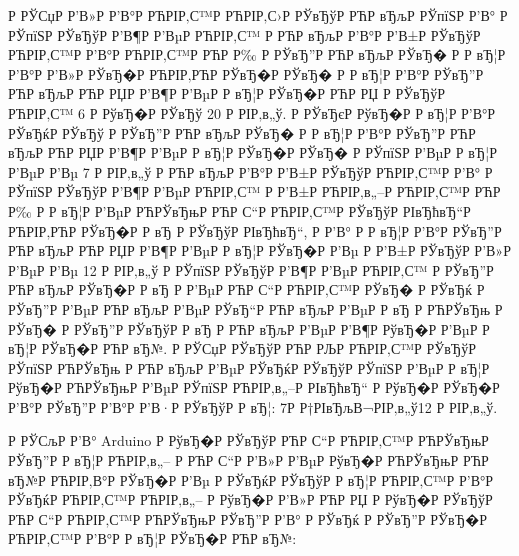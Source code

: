 \documentclass[a4paper,14pt]{extarticle}
\begin{document}
Р  РЎСџР  Р’В»Р  Р’В°Р РЋРІР‚С™Р РЋРІР‚С›Р  РЎвЂўР РЋР вЂљР  РЎпїЅР  Р’В° Р  РЎпїЅР  РЎвЂўР  Р’В¶Р  Р’ВµР РЋРІР‚С™ Р РЋР вЂљР  Р’В°Р  Р’В±Р  РЎвЂўР РЋРІР‚С™Р  Р’В°Р РЋРІР‚С™Р РЋР Р‰ Р  РЎвЂ”Р РЋР вЂљР  РЎвЂ� Р  Р вЂ¦Р  Р’В°Р  Р’В»Р  РЎвЂ�Р РЋРІР‚РЋР  РЎвЂ�Р  РЎвЂ� Р  Р вЂ¦Р  Р’В°Р  РЎвЂ”Р РЋР вЂљР РЋР РЏР  Р’В¶Р  Р’ВµР  Р вЂ¦Р  РЎвЂ�Р РЋР РЏ Р  РЎвЂўР РЋРІР‚С™ 6 Р  РўвЂ�Р  РЎвЂў 20 Р  РІР‚в„ў. Р  РЎвЂєР  РўвЂ�Р  Р вЂ¦Р  Р’В°Р  РЎвЂќР  РЎвЂў Р  РЎвЂ”Р РЋР вЂљР  РЎвЂ� Р  Р вЂ¦Р  Р’В°Р  РЎвЂ”Р РЋР вЂљР РЋР РЏР  Р’В¶Р  Р’ВµР  Р вЂ¦Р  РЎвЂ�Р  РЎвЂ� Р  РЎпїЅР  Р’ВµР  Р вЂ¦Р  Р’ВµР  Р’Вµ 7 Р  РІР‚в„ў Р РЋР вЂљР  Р’В°Р  Р’В±Р  РЎвЂўР РЋРІР‚С™Р  Р’В° Р  РЎпїЅР  РЎвЂўР  Р’В¶Р  Р’ВµР РЋРІР‚С™ Р  Р’В±Р РЋРІР‚в„–Р РЋРІР‚С™Р РЋР Р‰ Р  Р вЂ¦Р  Р’ВµР РЋРЎвЂњР РЋР С“Р РЋРІР‚С™Р  РЎвЂўР  РІвЂћвЂ“Р РЋРІР‚РЋР  РЎвЂ�Р  Р вЂ Р  РЎвЂўР  РІвЂћвЂ“, Р  Р’В° Р  Р вЂ¦Р  Р’В°Р  РЎвЂ”Р РЋР вЂљР РЋР РЏР  Р’В¶Р  Р’ВµР  Р вЂ¦Р  РЎвЂ�Р  Р’Вµ Р  Р’В±Р  РЎвЂўР  Р’В»Р  Р’ВµР  Р’Вµ 12 Р  РІР‚в„ў Р  РЎпїЅР  РЎвЂўР  Р’В¶Р  Р’ВµР РЋРІР‚С™ Р  РЎвЂ”Р РЋР вЂљР  РЎвЂ�Р  Р вЂ Р  Р’ВµР РЋР С“Р РЋРІР‚С™Р  РЎвЂ� Р  РЎвЂќ Р  РЎвЂ”Р  Р’ВµР РЋР вЂљР  Р’ВµР  РЎвЂ“Р РЋР вЂљР  Р’ВµР  Р вЂ Р РЋРЎвЂњ Р  РЎвЂ� Р  РЎвЂ”Р  РЎвЂўР  Р вЂ Р РЋР вЂљР  Р’ВµР  Р’В¶Р  РўвЂ�Р  Р’ВµР  Р вЂ¦Р  РЎвЂ�Р РЋР вЂ№. Р  РЎСџР  РЎвЂўР РЋР РЉР РЋРІР‚С™Р  РЎвЂўР  РЎпїЅР РЋРЎвЂњ Р РЋР вЂљР  Р’ВµР  РЎвЂќР  РЎвЂўР  РЎпїЅР  Р’ВµР  Р вЂ¦Р  РўвЂ�Р РЋРЎвЂњР  Р’ВµР  РЎпїЅР РЋРІР‚в„–Р  РІвЂћвЂ“ Р  РўвЂ�Р  РЎвЂ�Р  Р’В°Р  РЎвЂ”Р  Р’В°Р  Р’В·Р  РЎвЂўР  Р вЂ¦: 7Р Р†РІвЂљВ¬РІР‚в„ў12 Р  РІР‚в„ў.

Р  РЎСљР  Р’В° Arduino Р  РўвЂ�Р  РЎвЂўР РЋР С“Р РЋРІР‚С™Р РЋРЎвЂњР  РЎвЂ”Р  Р вЂ¦Р РЋРІР‚в„– Р РЋР С“Р  Р’В»Р  Р’ВµР  РўвЂ�Р РЋРЎвЂњР РЋР вЂ№Р РЋРІР‚В°Р  РЎвЂ�Р  Р’Вµ Р  РЎвЂќР  РЎвЂўР  Р вЂ¦Р РЋРІР‚С™Р  Р’В°Р  РЎвЂќР РЋРІР‚С™Р РЋРІР‚в„– Р  РўвЂ�Р  Р’В»Р РЋР РЏ Р  РўвЂ�Р  РЎвЂўР РЋР С“Р РЋРІР‚С™Р РЋРЎвЂњР  РЎвЂ”Р  Р’В° Р  РЎвЂќ Р  РЎвЂ”Р  РЎвЂ�Р РЋРІР‚С™Р  Р’В°Р  Р вЂ¦Р  РЎвЂ�Р РЋР вЂ№:
\end{document}
